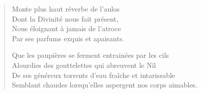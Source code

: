 \begin{verse}
  Monte plus haut réverbe de l’aulos\\  %
  Dont la Divinité nous fait présent,\\  %
  Nous éloignant à jamais de l’atroce\\  %
  Par ses parfums exquis et apaisants.

  Que les paupières se ferment entrainées par les cils\\  %
  Alourdies des gouttelettes qui abreuvent le Nil\\  %
  De ses généreux torrents d’eau fraîche et intarissable\\  %
  Semblant chaudes lorsqu’elles aspergent nos corps aimables.
\end{verse}


\newpage
\thispagestyle{empty}
\null\cleardoublepage
